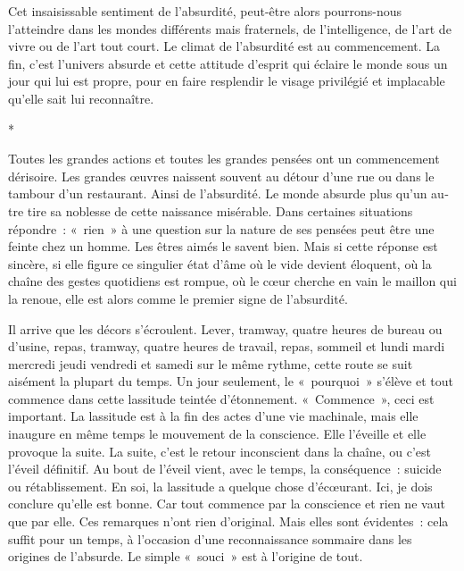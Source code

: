 \documentclass{book}
\begin{document}
Cet insaisissable sentiment de l'absurdité, peut-être alors pourrons-nous l'atteindre dans les mondes différents mais fraternels, de l'intelligence, de l'art de vivre ou de l'art tout court. Le climat de l'absurdité est au commencement. La fin, c'est l'univers absurde et cette attitude d'esprit qui éclaire le monde sous un jour qui lui est propre, pour en faire resplendir le visage privilégié et implacable qu'elle sait lui reconnaître.

\begin{center}
*
\end{center}

Toutes les grandes actions et toutes les grandes pensées ont un commencement dérisoire. Les grandes œuvres naissent souvent au détour d'une rue ou dans le tambour d'un restaurant. Ainsi de l'absurdité. Le monde absurde plus qu'un au­tre tire sa noblesse de cette naissance misérable. Dans certaines situations répondre : « rien » à une question sur la nature de ses pensées peut être une feinte chez un homme. Les êtres aimés le savent bien. Mais si cette réponse est sincère, si elle figure ce singulier état d'âme où le vide devient éloquent, où la chaîne des gestes quotidiens est rompue, où le cœur cherche en vain le maillon qui la renoue, elle est alors comme le premier signe de l'absurdité.

Il arrive que les décors s'écroulent. Lever, tramway, quatre heures de bureau ou d'usine, repas, tramway, quatre heures de travail, repas, sommeil et lundi mardi mercredi jeudi vendredi et samedi sur le même rythme, cette route se suit aisément la plupart du temps. Un jour seulement, le « pourquoi » s'élève et tout commence dans cette lassitude teintée d'étonnement. « Commence », ceci est important. La lassitude est à la fin des actes d'une vie machinale, mais elle inaugure en même temps le mouvement de la conscience. Elle l'éveille et elle provoque la suite. La suite, c'est le retour inconscient dans la chaîne, ou c'est l'éveil définitif. Au bout de l'éveil vient, avec le temps, la conséquence : suicide ou rétablissement. En soi, la lassitude a quelque chose d'écœurant. Ici, je dois conclure qu'elle est bonne. Car tout commence par la conscience et rien ne vaut que par elle. Ces remarques n'ont rien d'original. Mais elles sont évidentes : cela suffit pour un temps, à l'occasion d'une reconnaissance sommaire dans les origines de l'absurde. Le simple « souci » est à l'origine de tout.
\end{document}
